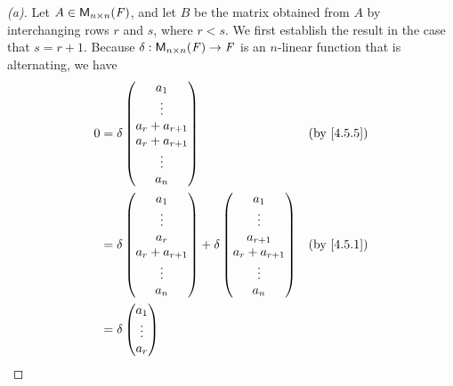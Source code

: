 \begin{proof}[(a)]
	Let \(A \in \mathsf{M}_{{n} \times n}({\mathit{F}})\), and let \(B\) be the matrix obtained from \(A\) by interchanging rows \(r\) and \(s\), where \(r < s\).
	We first establish the result in the case that \(s = r + 1\).
	Because \(\delta : \mathsf{M}_{{n} \times n}({\mathit{F}}) \to \mathit{F}\) is an \(n\)-linear function that is alternating, we have
	\begin{align*}
		0 & = \delta\begin{pmatrix}
			            a_1             \\
			            \vdots          \\
			            a_r + a_{r + 1} \\
			            a_r + a_{r + 1} \\
			            \vdots          \\
			            a_n
		            \end{pmatrix}               &  & \by{4.5.5}                                                     \\
		  & = \delta\begin{pmatrix}
			            a_1             \\
			            \vdots          \\
			            a_r             \\
			            a_r + a_{r + 1} \\
			            \vdots          \\
			            a_n
		            \end{pmatrix} + \delta\begin{pmatrix}
			                                  a_1             \\
			                                  \vdots          \\
			                                  a_{r + 1}       \\
			                                  a_r + a_{r + 1} \\
			                                  \vdots          \\
			                                  a_n
		                                  \end{pmatrix} &  & \by{4.5.1}                                             \\
		  & = \delta\begin{pmatrix}
			            a_1    \\
			            \vdots \\
			            a_r    \\

\end{pmatrix}
\end{align*}
\end{proof}
